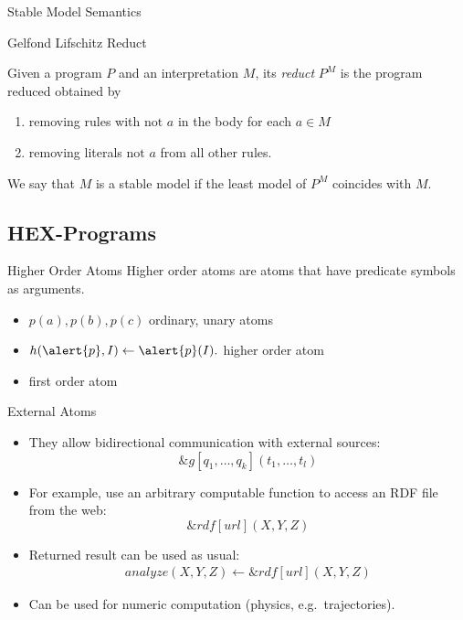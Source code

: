 \documentclass[smaller,dvipsnames]{beamer}
\begin{document}
\begin{frame}{Stable Model Semantics}
	\begin{center} {\large{Gelfond Lifschitz Reduct}} \end{center}
	Given a program \(P\) and an interpretation \(M\), its \emph{reduct} \(P^M\) is the program reduced obtained by 
	\begin{enumerate}
		\item removing rules with \(\text{not } a\) in the body for each \(a \in M\)
		\item removing literals \(\text{not } a\) from all other rules.
	\end{enumerate}	  
	We say that \(M\) is a stable model if the least model of \(P^M\) coincides with \(M\).
\end{frame}

\subsection{HEX-Programs}

\begin{frame}{Higher Order Atoms}
	Higher order atoms are atoms that have predicate symbols as arguments.
	\begin{itemize}[<+->]
		\item[] \(p(a),p(b),p(c)\) \quad \quad \quad \quad \quad ordinary, unary atoms
		\item[] \(h(\alert{p},I) \leftarrow \alert{p}(I).\) \quad \quad \quad \quad \quad higher order atom
		\item[] \alert{first order atom}
	\end{itemize}
\end{frame}

\begin{frame}{External Atoms}
    \begin{itemize}[<+->]
    	\item They allow bidirectional communication with external sources: \[ \&g[q_1,\dots,q_k](t_1,\dots,t_l) \]
    	\item For example, use an arbitrary computable function to access an RDF file from the web: \[ \&rdf[url](X,Y,Z) \]
    	\item Returned result can be used as usual:
    		\begin{align*}
				analyze(X,Y,Z) \leftarrow \&rdf[url](X,Y,Z)
    		\end{align*}
    	\item Can be used for numeric computation (physics, e.g.~trajectories).
    \end{itemize}
\end{frame}
\end{document}
